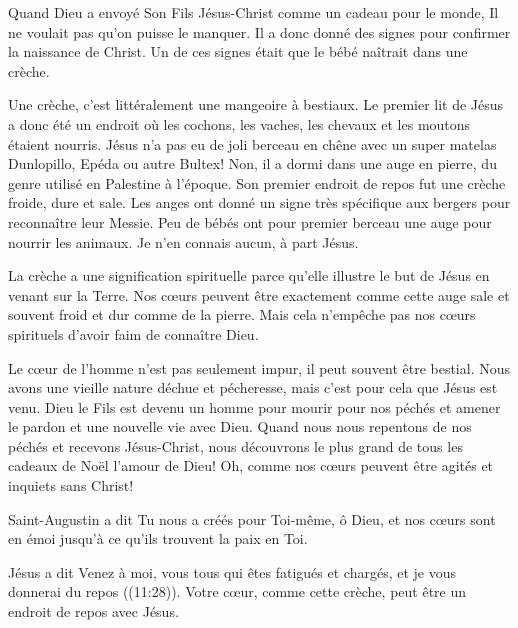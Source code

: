 

Quand Dieu a envoyé Son Fils Jésus-Christ comme un cadeau pour le monde, Il ne voulait pas qu'on puisse le manquer. Il a donc donné des signes pour confirmer la naissance de Christ. Un de ces signes était que le bébé naîtrait dans une crèche. 

Une crèche, c'est littéralement une mangeoire à bestiaux. Le premier lit de Jésus a donc été un endroit où les cochons, les vaches, les chevaux et les moutons étaient nourris. Jésus n'a pas eu de joli berceau en chêne avec un super matelas Dunlopillo, Epéda ou autre Bultex! Non, il a dormi dans une auge en pierre, du genre utilisé en Palestine à l'époque. Son premier endroit de repos fut une crèche froide, dure et sale. Les anges ont donné un signe très spécifique aux bergers pour reconnaître leur Messie. Peu de bébés ont pour premier berceau une auge pour nourrir les animaux. Je n'en connais aucun, à part Jésus. 

La crèche a une signification spirituelle parce qu'elle illustre le but de Jésus en venant sur la Terre. Nos cœurs peuvent être exactement comme cette auge \ocadr sale et souvent froid et dur comme de la pierre. Mais cela n'empêche pas nos cœurs spirituels d'avoir faim de connaître Dieu.

Le cœur de l'homme n'est pas seulement impur, il peut souvent être bestial. Nous avons une vieille nature déchue et pécheresse, mais c'est pour cela que Jésus est venu. Dieu le Fils est devenu un homme pour mourir pour nos péchés et amener le pardon et une nouvelle vie avec Dieu. Quand nous nous repentons de nos péchés et recevons Jésus-Christ, nous découvrons le plus grand de tous les cadeaux de Noël\frcolon{} l'amour de Dieu! Oh, comme nos cœurs peuvent être agités et inquiets sans Christ! 

Saint-Augustin a dit\frcolon{} \Og Tu nous a créés pour Toi-même, ô Dieu, et nos c\oe{}urs sont en émoi jusqu’à ce qu’ils trouvent la paix en Toi. \Fg{}

Jésus a dit\frcolon{} \Og Venez à moi, vous tous qui êtes fatigués et chargés, et je vous donnerai du repos \Fg{} ((11:28)). Votre cœur, comme cette crèche, peut être un endroit de repos avec Jésus.


